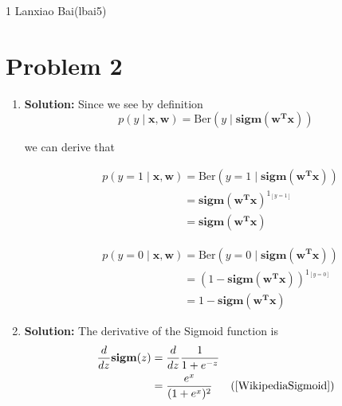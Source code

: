 \documentclass[11pt]{article}
\begin{document}
\homework
    {1}
    {Lanxiao Bai(lbai5)}
    {}

\section*{Problem 2}
\begin{enumerate}
	\item \textbf{Solution:} Since we see by definition
	\[p(y \mid \mathbf{x,w})=\text{Ber}(y \mid \mathbf{sigm}(\mathbf{w^Tx}))\]
	
	we can derive that
	
	\begin{align}
		&p(y = 1 \mid \mathbf{x,w}) = \text{Ber}(y = 1 \mid \mathbf{sigm}(\mathbf{w^Tx}))\nonumber\\
		&\phantom{p(y = 1 \mid \mathbf{x,w})} = \mathbf{sigm}(\mathbf{w^Tx})^{1_{[y = 1]}}\nonumber\\
		&\phantom{p(y = 1 \mid \mathbf{x,w})} = \mathbf{sigm}(\mathbf{w^Tx})
	\end{align}
	
	\begin{align}
		&p(y = 0 \mid \mathbf{x,w}) = \text{Ber}(y = 0 \mid \mathbf{sigm}(\mathbf{w^Tx}))\nonumber\\
		&\phantom{p(y = 0 \mid \mathbf{x,w})} = (1 - \mathbf{sigm}(\mathbf{w^Tx}))^{1_{[y = 0]}}\nonumber\\
		&\phantom{p(y = 0 \mid \mathbf{x,w})} = 1 - \mathbf{sigm}(\mathbf{w^Tx})
	\end{align}
	
	\item \textbf{Solution:} The derivative of the Sigmoid function is
		\begin{align}
			&\frac{d}{dz}\mathbf{sigm}(z) = \frac{d}{dz} \frac{1}{1 + e^{-z}}\nonumber\\
			&\phantom{\frac{d}{dz}\mathbf{sigm}(z)} = \frac{e^x}{(1 + e^x)^2}& (\cite{WikipediaSigmoid})\nonumber
		\end{align}
		

\end{enumerate}
\end{document}
